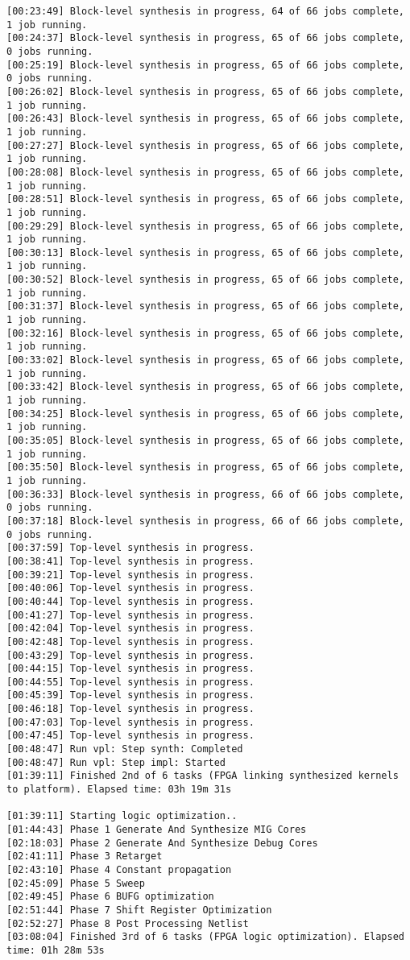 \begin{lstlisting}[label=lst:code_2,caption=Содержимое файла  v++*.log]
[00:23:49] Block-level synthesis in progress, 64 of 66 jobs complete, 1 job running.
[00:24:37] Block-level synthesis in progress, 65 of 66 jobs complete, 0 jobs running.
[00:25:19] Block-level synthesis in progress, 65 of 66 jobs complete, 0 jobs running.
[00:26:02] Block-level synthesis in progress, 65 of 66 jobs complete, 1 job running.
[00:26:43] Block-level synthesis in progress, 65 of 66 jobs complete, 1 job running.
[00:27:27] Block-level synthesis in progress, 65 of 66 jobs complete, 1 job running.
[00:28:08] Block-level synthesis in progress, 65 of 66 jobs complete, 1 job running.
[00:28:51] Block-level synthesis in progress, 65 of 66 jobs complete, 1 job running.
[00:29:29] Block-level synthesis in progress, 65 of 66 jobs complete, 1 job running.
[00:30:13] Block-level synthesis in progress, 65 of 66 jobs complete, 1 job running.
[00:30:52] Block-level synthesis in progress, 65 of 66 jobs complete, 1 job running.
[00:31:37] Block-level synthesis in progress, 65 of 66 jobs complete, 1 job running.
[00:32:16] Block-level synthesis in progress, 65 of 66 jobs complete, 1 job running.
[00:33:02] Block-level synthesis in progress, 65 of 66 jobs complete, 1 job running.
[00:33:42] Block-level synthesis in progress, 65 of 66 jobs complete, 1 job running.
[00:34:25] Block-level synthesis in progress, 65 of 66 jobs complete, 1 job running.
[00:35:05] Block-level synthesis in progress, 65 of 66 jobs complete, 1 job running.
[00:35:50] Block-level synthesis in progress, 65 of 66 jobs complete, 1 job running.
[00:36:33] Block-level synthesis in progress, 66 of 66 jobs complete, 0 jobs running.
[00:37:18] Block-level synthesis in progress, 66 of 66 jobs complete, 0 jobs running.
[00:37:59] Top-level synthesis in progress.
[00:38:41] Top-level synthesis in progress.
[00:39:21] Top-level synthesis in progress.
[00:40:06] Top-level synthesis in progress.
[00:40:44] Top-level synthesis in progress.
[00:41:27] Top-level synthesis in progress.
[00:42:04] Top-level synthesis in progress.
[00:42:48] Top-level synthesis in progress.
[00:43:29] Top-level synthesis in progress.
[00:44:15] Top-level synthesis in progress.
[00:44:55] Top-level synthesis in progress.
[00:45:39] Top-level synthesis in progress.
[00:46:18] Top-level synthesis in progress.
[00:47:03] Top-level synthesis in progress.
[00:47:45] Top-level synthesis in progress.
[00:48:47] Run vpl: Step synth: Completed
[00:48:47] Run vpl: Step impl: Started
[01:39:11] Finished 2nd of 6 tasks (FPGA linking synthesized kernels to platform). Elapsed time: 03h 19m 31s 

[01:39:11] Starting logic optimization..
[01:44:43] Phase 1 Generate And Synthesize MIG Cores
[02:18:03] Phase 2 Generate And Synthesize Debug Cores
[02:41:11] Phase 3 Retarget
[02:43:10] Phase 4 Constant propagation
[02:45:09] Phase 5 Sweep
[02:49:45] Phase 6 BUFG optimization
[02:51:44] Phase 7 Shift Register Optimization
[02:52:27] Phase 8 Post Processing Netlist
[03:08:04] Finished 3rd of 6 tasks (FPGA logic optimization). Elapsed time: 01h 28m 53s 


\end{lstlisting}
